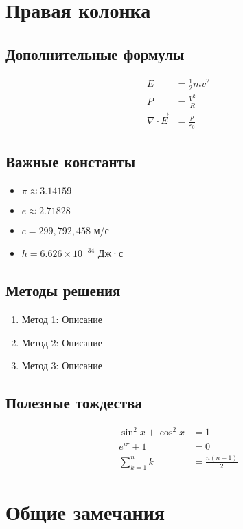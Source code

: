 \documentclass[10pt,landscape,a4paper]{article}
\begin{document}
\begin{multicols}{2}
\section{Правая колонка}

\subsection{Дополнительные формулы}
\begin{align}
    E &= \frac{1}{2}mv^2 \\
    P &= \frac{V^2}{R} \\
    \nabla \cdot \vec{E} &= \frac{\rho}{\varepsilon_0}
\end{align}

\subsection{Важные константы}
\begin{itemize}
    \item $\pi \approx 3.14159$
    \item $e \approx 2.71828$
    \item $c = 299,792,458$ м/с
    \item $h = 6.626 \times 10^{-34}$ Дж·с
\end{itemize}

\subsection{Методы решения}
\begin{enumerate}
    \item Метод 1: Описание
    \item Метод 2: Описание
    \item Метод 3: Описание
\end{enumerate}

\subsection{Полезные тождества}
\begin{align}
    \sin^2 x + \cos^2 x &= 1 \\
    e^{i\pi} + 1 &= 0 \\
    \sum_{k=1}^n k &= \frac{n(n+1)}{2}
\end{align}

\section{Общие замечания}


\end{multicols}
\end{document}
